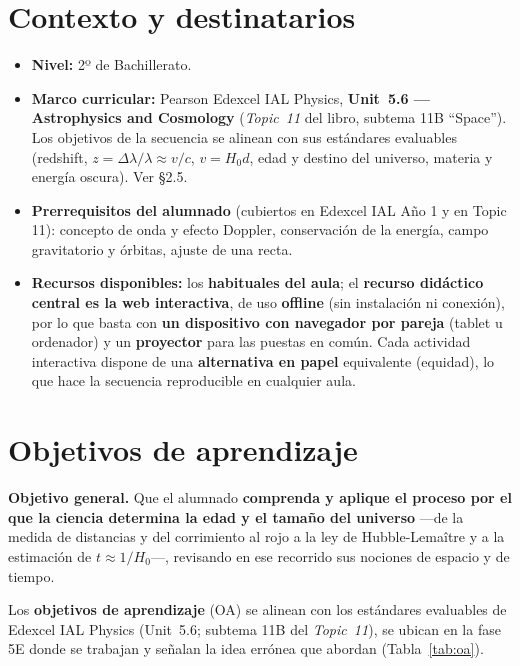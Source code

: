 \section{Contexto y destinatarios}\label{sec:destinatarios}

\begin{itemize}
\item \textbf{Nivel:} 2º de Bachillerato.
\item \textbf{Marco curricular:} Pearson Edexcel IAL Physics, \textbf{Unit~5.6 --- Astrophysics and Cosmology} (\textit{Topic~11} del libro, subtema 11B ``Space''). Los objetivos de la secuencia se alinean con sus estándares evaluables (redshift, $z = \Delta\lambda/\lambda \approx v/c$, $v = H_{0}d$, edad y destino del universo, materia y energía oscura). Ver §2.5.
\item \textbf{Prerrequisitos del alumnado} (cubiertos en Edexcel IAL Año 1 y en Topic 11): concepto de onda y efecto Doppler, conservación de la energía, campo gravitatorio y órbitas, ajuste de una recta.
\item \textbf{Recursos disponibles:} los \textbf{habituales del aula}; el \textbf{recurso didáctico central es la web interactiva}, de uso \textbf{offline} (sin instalación ni conexión), por lo que basta con \textbf{un dispositivo con navegador por pareja} (tablet u ordenador) y un \textbf{proyector} para las puestas en común. Cada actividad interactiva dispone de una \textbf{alternativa en papel} equivalente (equidad), lo que hace la secuencia reproducible en cualquier aula.
\end{itemize}

\section{Objetivos de aprendizaje}\label{sec:objetivos5e}

\textbf{Objetivo general.} Que el alumnado \textbf{comprenda y aplique el proceso por el que la ciencia determina la edad y el tamaño del universo} ---de la medida de distancias y del corrimiento al rojo a la ley de Hubble-Lemaître y a la estimación de $t \approx 1/H_{0}$---, revisando en ese recorrido sus nociones de espacio y de tiempo.

Los \textbf{objetivos de aprendizaje} (OA) se alinean con los estándares evaluables de Edexcel IAL Physics (Unit~5.6; subtema 11B del \textit{Topic~11}), se ubican en la fase 5E donde se trabajan y señalan la idea errónea que abordan (Tabla~\ref{tab:oa}).

